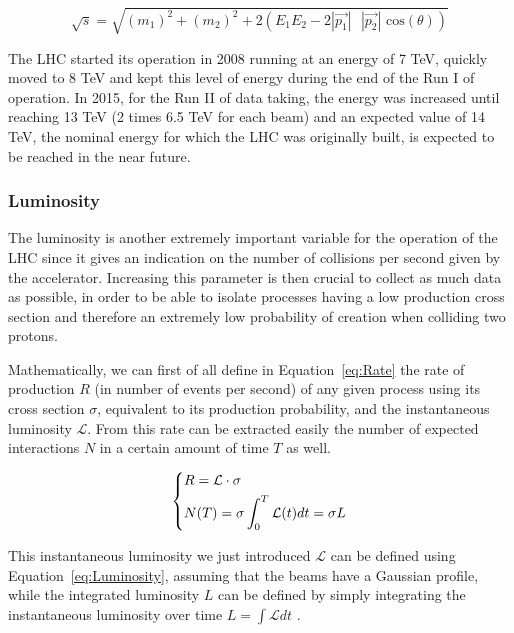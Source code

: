 \documentclass[a4paper, 10pt, openright]{report}
\begin{document}
\begin{equation}
\label{eq:CMEnergy}
\sqrt{s} = \sqrt{(m_1)^2 + (m_2)^2 + 2 \left (E_1 E_2-2 |\overrightarrow{p_1}| \text{ } |\overrightarrow{p_2}| \text{ cos}(\theta) \right )}
\end{equation}

The LHC started its operation in 2008 running at an energy of 7 TeV, quickly moved to 8 TeV and kept this level of energy during the end of the Run I of operation. In 2015, for the Run II of data taking, the energy was increased until reaching 13 TeV (2 times 6.5 TeV for each beam) and an expected value of 14 TeV, the nominal energy for which the \ac{LHC} was originally built, is expected to be reached in the near future.

\subsubsection{Luminosity} \label{subsection:Lumi}

The luminosity is another extremely important variable for the operation of the \ac{LHC} since it gives an indication on the number of collisions per second given by the accelerator. Increasing this parameter is then crucial to collect as much data as possible, in order to be able to isolate processes having a low production cross section and therefore an extremely low probability of creation when colliding two protons.

Mathematically, we can first of all define in Equation~\ref{eq:Rate} the rate of production $R$ (in number of events per second) of any given process using its cross section $\sigma$, equivalent to its production probability, and the instantaneous luminosity $\mathcal{L}$. From this rate can be extracted easily the number of expected interactions $N$ in a certain amount of time $T$ as well. 

\begin{equation}
\label{eq:Rate}
\begin{dcases}
R = \mathcal{L} \cdot \sigma \\
N(T) = \sigma \int_0^T \mathcal{L}(t) dt = \sigma L
\end{dcases}
\end{equation}

This instantaneous luminosity we just introduced $\mathcal{L}$ can be defined using Equation~\ref{eq:Luminosity}, assuming that the beams have a Gaussian profile, while the integrated luminosity $L$ can be defined by simply integrating the instantaneous luminosity over time $L = \int \mathcal{L}dt$ \cite{Thomson}.
\end{document}
